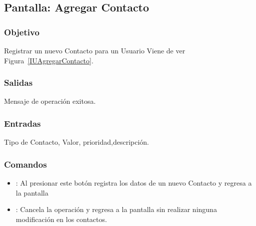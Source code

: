 \subsection{Pantalla: Agregar Contacto}

\subsubsection{Objetivo}
Registrar un nuevo Contacto para un Usuario Viene de  ver Figura~\ref{IUAgregarContacto}.



\subsubsection{Salidas}
Mensaje de operación exitosa.

\subsubsection{Entradas}
Tipo de Contacto, Valor, prioridad,descripción.


\subsubsection{Comandos}
\begin{itemize}
 \item {}: Al presionar este botón registra los datos de un nuevo Contacto y regresa a la pantalla 
 \item {}: Cancela la operación y regresa a la pantalla  sin realizar ninguna modificación en los contactos.
\end{itemize}





